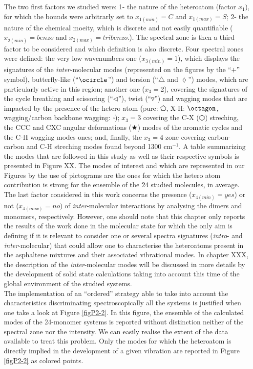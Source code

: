 	The two first factors we studied were: 1- the nature of the heteroatom (factor $x_1$), for which the bounds were arbitrarly set to $x_{1(min)}=C$ and $x_{1(max)}=S$; 2- the nature of the chemical moeity, which is discrete and not easily quantifiable ($x_{2(min)}=benzo$ and $x_{2(max)}=tribenzo$.). The spectral zone is then a third factor to be considered and which definition is also discrete. 
	Four spectral zones were defined: the very low wavenumbers one ($x_{3(min)}=1$), which displays the signatures of the \textit{inter}-molecular modes (represented on the figures by the “$ + $” symbol), butterfly-like (“$\ocircle$”) and torsion (“$\triangle$ and $\lozenge$”) modes, which are particularly active in this region; another one ($x_3=2$), covering the signatures of the cycle breathing and scissoring (“$\lhd$”), twist (“$\triangledown$”) and wagging modes that are impacted by the presence of the hetero atom (pure: $\pentagon$, X-H: $\octagon$, wagging/carbon backbone wagging: $\square$); $x_3=3$ covering the C-X ($\varhexagon$) streching, the CCC and CXC angular deformations ($\bigstar$) modes of the aromatic cycles and the C-H wagging modes ones; and, finally, the $x_3=4$ zone covering carbon-carbon and C-H streching modes found beyond 1300 cm$^{-1}$.  A table summarizing the modes that are followed in this study as well as their respective symbols is presented in Figure XX. The modes of interest and which are represented in our Figures by the use of pictograms are the ones for which the hetero atom contribution is strong for the ensemble of the 24 studied molecules, in average. The last factor considered in this work concerns the presence ($x_{4(min)}=yes$) or not ($x_{4(max)}=no$) of \textit{inter}-molecular interactions by analysing the dimers and monomers, respectively. However, one should note that this chapter only reports the results of the work done in the molecular state for which the only aim is defining if it is relevant to consider one or several spectra signatures (\textit{intra}- and \textit{inter}-molecular) that could allow one to characterise the heteroatoms present in the asphaltene mixtures and their associated vibrational modes. In chapter XXX, the description of the \textit{inter}-molecular modes will be discussed in more details by the development of solid state calculations taking into account this time of the global environment of the studied systems.\\
	
	The implementation of an “ordered” strategy able to take into account the characteristics discriminating spectroscopically all the systems is justified when one take a look at Figure \ref{figP2-2}. In this figure, the ensemble of the calculated modes of the 24-monomer systems is reported without distinction neither of the spectral zone nor the intensity. We can easily realise the extent of the data available to treat this problem. Only the modes for which the heteroatom is directly implied  in the development of a given vibration are reported in Figure \ref{figP2-2} as colored points.
	
